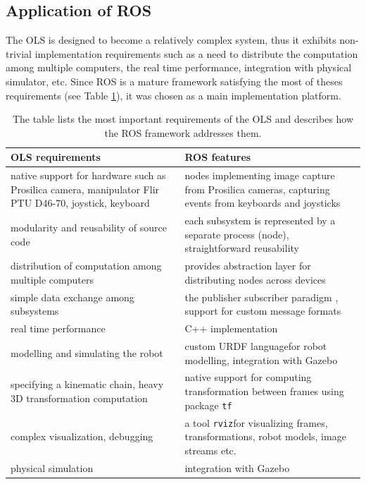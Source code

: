 \subsection{Application of ROS}

The OLS is designed to become a relatively complex system, thus it exhibits non-trivial implementation requirements such as a need to distribute the computation among multiple computers, the real time performance, integration with physical simulator, etc. Since ROS is a mature framework satisfying the most of theses requirements (see Table \ref{tab:ols_requirements_ros_features}), it was chosen as a main implementation platform.


{\renewcommand{\arraystretch}{1.5}
\begin{table}[htbp]
	\centering
	\caption{The table lists the most important requirements of the OLS and describes how the ROS framework addresses them.}
	\begin{tabularx}{0.99\textwidth}{XX}
		\toprule
		\textbf{OLS requirements} & \textbf{ROS features} \\
		\midrule
		native support for hardware such as Prosilica camera, manipulator Flir PTU D46-70, joystick, keyboard & nodes implementing image capture from Prosilica cameras, capturing events from keyboards and joysticks \\
		modularity and reusability of source code & each subsystem is represented by a separate process (node), straightforward reusability \\
		distribution of computation among multiple computers & provides abstraction layer for distributing nodes across devices \\
		simple data exchange among subsystems & the publisher subscriber paradigm \cite{O'Kane201310}, support for custom message formats \\
		real time performance & C++ implementation \\
		modelling and simulating the robot & custom URDF language\footnotemark for robot modelling, integration with Gazebo \\
		specifying a kinematic chain, heavy 3D transformation computation & native support for computing transformation between frames using package \texttt{tf} \\
		complex visualization, debugging & a tool \texttt{rviz}\footnotemark for visualizing frames, transformations, robot models, image streams etc. \\
		physical simulation & integration with Gazebo \\
		\bottomrule
	\end{tabularx}
	\label{tab:ols_requirements_ros_features}
\end{table}}

